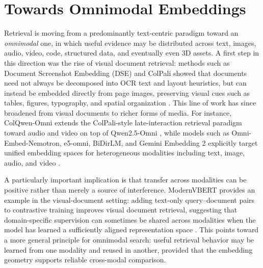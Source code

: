 \section{Towards Omnimodal Embeddings}

Retrieval is moving from a predominantly text-centric paradigm toward an \emph{omnimodal} one, in which useful evidence may be distributed across text, images, audio, video, code, structured data, and eventually even 3D assets. A first step in this direction was the rise of visual document retrieval: methods such as Document Screenshot Embedding (DSE) and ColPali showed that documents need not always be decomposed into OCR text and layout heuristics, but can instead be embedded directly from page images, preserving visual cues such as tables, figures, typography, and spatial organization . This line of work has since broadened from visual documents to richer forms of media. For instance, ColQwen-Omni  extends the ColPali-style late-interaction retrieval paradigm toward audio and video on top of Qwen2.5-Omni , while models such as Omni-Embed-Nemotron, e5-omni, BiDirLM, and Gemini Embedding 2 explicitly target unified embedding spaces for heterogeneous modalities including text, image, audio, and video .

A particularly important implication is that transfer across modalities can be positive rather than merely a source of interference. ModernVBERT provides an example in the visual-document setting: adding text-only query--document pairs to contrastive training improves visual document retrieval, suggesting that domain-specific supervision can sometimes be shared across modalities when the model has learned a sufficiently aligned representation space . This points toward a more general principle for omnimodal search: useful retrieval behavior may be learned from one modality and reused in another, provided that the embedding geometry supports reliable cross-modal comparison.

